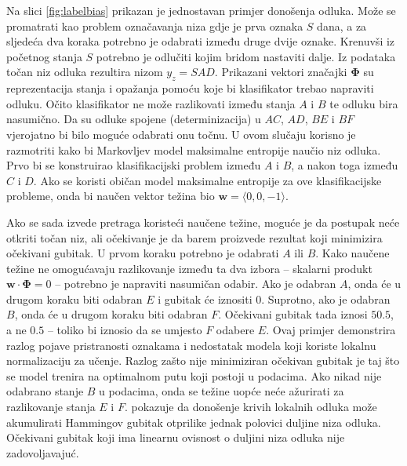 Na slici \ref{fig:labelbias} prikazan je jednostavan primjer donošenja odluka.
Može se promatrati kao problem označavanja niza gdje je prva oznaka $S$ dana, a
za sljedeća dva koraka potrebno je odabrati između druge dvije oznake. Krenuvši
iz početnog stanja $S$ potrebno je odlučiti kojim bridom nastaviti dalje. Iz
podataka točan niz odluka rezultira nizom $y_z = SAD$. Prikazani vektori
značajki $\mathbf{\Phi}$ su reprezentacija stanja i opažanja pomoću koje bi
klasifikator trebao napraviti odluku. Očito klasifikator ne može razlikovati
između stanja $A$ i $B$ te odluku bira nasumično. Da su odluke spojene
(determinizacija) u $AC$, $AD$, $BE$ i $BF$ vjerojatno bi bilo moguće odabrati
onu točnu. U ovom slučaju korisno je razmotriti kako bi Markovljev model
maksimalne entropije naučio niz odluka. Prvo bi se konstruirao klasifikacijski
problem između $A$ i $B$, a nakon toga između $C$ i $D$. Ako se koristi običan
model maksimalne entropije za ove klasifikacijske probleme, onda bi naučen
vektor težina bio $\mathbf{w} = \langle 0,0,-1 \rangle$.

Ako se sada izvede pretraga koristeći naučene težine, moguće je da postupak neće
otkriti točan niz, ali očekivanje je da barem proizvede rezultat koji minimizira
očekivani gubitak. U prvom koraku potrebno je odabrati $A$ ili $B$. Kako naučene
težine ne omogućavaju razlikovanje između ta dva izbora -- skalarni produkt
$\mathbf{w} \cdot \mathbf{\Phi} = 0$ -- potrebno je napraviti nasumičan odabir.
Ako je odabran $A$, onda će u drugom koraku biti odabran $E$ i gubitak će
iznositi 0. Suprotno, ako je odabran $B$, onda će u drugom koraku biti odabran
$F$. Očekivani gubitak tada iznosi $50.5$, a ne $0.5$ -- toliko bi iznosio da se
umjesto $F$ odabere $E$. Ovaj primjer demonstrira razlog pojave pristranosti
oznakama i nedostatak modela koji koriste lokalnu normalizaciju za učenje.
Razlog zašto nije minimiziran očekivan gubitak je taj što se model trenira na
optimalnom putu koji postoji u podacima. Ako nikad nije odabrano stanje $B$ u
podacima, onda se težine uopće neće ažurirati za razlikovanje stanja $E$ i $F$.
\citet{kaariainen2006lower} pokazuje da donošenje krivih lokalnih odluka može
akumulirati Hammingov gubitak otprilike jednak polovici duljine niza odluka.
Očekivani gubitak koji ima linearnu ovisnost o duljini niza odluka nije
zadovoljavajuć.

